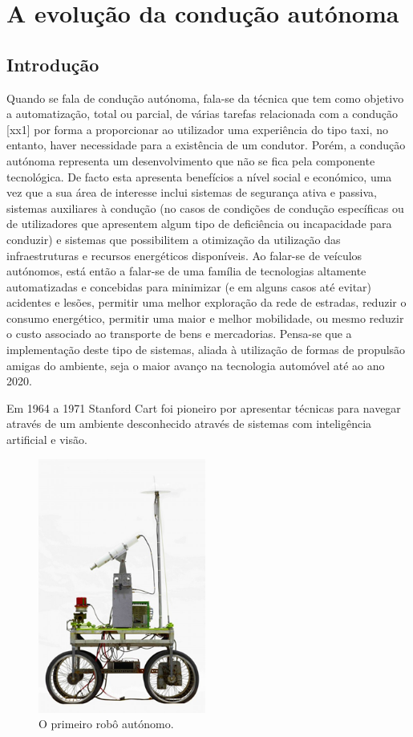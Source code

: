 \documentclass[a4paper,10pt]{texRel}
\begin{document}


\chapter{A evolução da condução autónoma}


\section{Introdução}

Quando se fala de condução autónoma, fala-se da técnica que tem como objetivo a automatização, total ou parcial, de várias tarefas relacionada com a condução [xx1] por forma a proporcionar ao utilizador uma experiência do tipo taxi, no entanto, haver necessidade para a existência de um condutor.
Porém, a condução autónoma representa um desenvolvimento que não se fica pela componente tecnológica. De facto esta apresenta benefícios a nível social e económico, uma vez que a sua área de interesse inclui sistemas de segurança ativa e passiva, sistemas auxiliares à condução (no casos de condições de condução específicas ou de utilizadores que apresentem algum tipo de deficiência ou incapacidade para conduzir) e sistemas que possibilitem a otimização da utilização das infraestruturas e recursos energéticos disponíveis.
Ao falar-se de veículos autónomos, está então a falar-se de uma família de tecnologias altamente automatizadas e concebidas para minimizar (e em alguns casos até evitar) acidentes e lesões, permitir uma melhor exploração da rede de estradas, reduzir o consumo energético, permitir uma maior e melhor mobilidade, ou mesmo reduzir o custo associado ao transporte de bens e mercadorias.
Pensa-se que a implementação deste tipo de sistemas, aliada à utilização de formas de propulsão amigas do ambiente, seja o maior avanço na tecnologia automóvel até ao ano 2020.


Em 1964 a 1971 Stanford Cart foi pioneiro por apresentar técnicas para navegar através de um ambiente desconhecido através de sistemas com inteligência artificial e visão.
\begin{figure}[H]
\centering
\includegraphics[width=55mm,scale=0.5]{imagens/cap2/Stanford_AIL_1964.png}
\caption{O primeiro robô autónomo.}
\label{fig1}
\end{figure}
\end{document}
